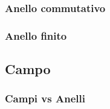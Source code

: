 \subsubsection{Anello commutativo}

\textsf{\small }

\subsubsection{Anello finito} %

\textsf{\small }

\subsection{Campo} %


\textsf{\small }

\subsubsection{Campi vs Anelli} %

\textsf{\small }


